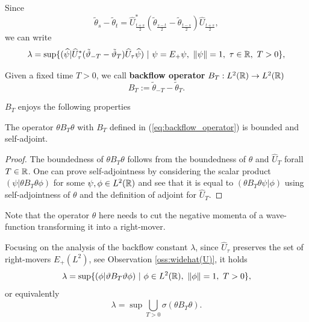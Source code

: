 Since
\begin{equation}
	\tilde{\theta}_s-\tilde{\theta}_t=\widehat{U}^*_{\frac{t+s}{2}}(\tilde{\theta}_{\frac{s-t}{2}}-\tilde{\theta}_{\frac{t-s}{2}})\widehat{U}_{\frac{t+s}{2}},
\end{equation}
we can write
\begin{equation}
	\lambda=\sup\{  (   \widehat{\psi}  |  \widehat{U}^*_{\tau}(\tilde{\vartheta}_{-T}-\tilde{\vartheta}_{T})\widehat{U}_{\tau}\widehat{\psi}) \ |\ \psi=E_+\psi,\ \|\psi\|=1,\ \tau\in{\mathbb R},\ T>0\},
\end{equation}
\begin{definition}
	Given a fixed time $T>0$, we call \textbf{backflow operator} $B_T:L^2({\mathbb R})\to L^2({\mathbb R})$
	\begin{equation}
		B_T:=\tilde{\theta}_{-T}-\tilde{\theta}_T.
		\label{eq:backflow_operator}
	\end{equation}
\end{definition}
$B_T$ enjoys the following properties
\begin{prop}
	\label{prop:backflow_operator}
	The operator $\theta B_T\theta$ with $B_T$ defined in (\ref{eq:backflow_operator}) is bounded and self-adjoint.
\end{prop}
\begin{proof}
	The boundedness of $\theta B_T\theta$ follows from the boundedness of $\theta$ and $\widehat{U}_T$ forall $T\in{\mathbb R}$. One can prove self-adjointness by considering the scalar product $(\psi|\theta B_T\theta \phi)$ for some $\psi,\phi\in L^2({\mathbb R})$ and see that it is equal to $(\theta B_T\theta\psi|\phi)$ using self-adjointness of $\theta$ and the definition of adjoint for $\widehat{U}_T$.
\end{proof}

\begin{oss}
	Note that the operator $\theta$ here needs to cut the negative momenta of a wave-function transforming it into a right-mover.
\end{oss}

Focusing on the analysis of the backflow constant $\lambda$, since $\widehat{U}_\tau$ preserves the set of right-movers $E_+(L^2)$, see Observation \ref{oss:widehat(U)}, it holds
\begin{equation}
	\lambda=\sup\{(\phi|\theta B_T\theta \phi)\ |\ \phi\in L^2(\mR),\ \|\phi\|=1,\ T>0 \},
\end{equation} 
or equivalently 
\begin{equation}
	\lambda=\sup\bigcup_{T>0}\sigma(\theta B_T\theta).
	\label{eq:lambda_sum}
\end{equation}

